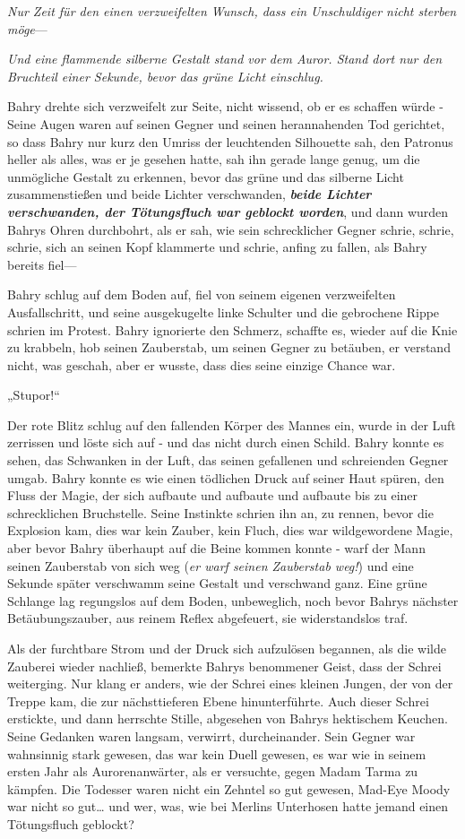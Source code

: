 {\emph{Nur Zeit für den einen verzweifelten Wunsch, dass ein Unschuldiger nicht sterben möge}—

\emph{Und eine flammende silberne Gestalt stand vor dem Auror. Stand dort nur den Bruchteil einer Sekunde, bevor das grüne Licht einschlug.}

Bahry drehte sich verzweifelt zur Seite, nicht wissend, ob er es schaffen würde - Seine Augen waren auf seinen Gegner und seinen herannahenden Tod gerichtet, so dass Bahry nur kurz den Umriss der leuchtenden Silhouette sah, den Patronus heller als alles, was er je gesehen hatte, sah ihn gerade lange genug, um die unmögliche Gestalt zu erkennen, bevor das grüne und das silberne Licht zusammenstießen und beide Lichter verschwanden, \textbf{\emph{beide Lichter verschwanden, der Tötungsfluch war geblockt worden}}, und dann wurden Bahrys Ohren durchbohrt, als er sah, wie sein schrecklicher Gegner schrie, schrie, schrie, sich an seinen Kopf klammerte und schrie, anfing zu fallen, als Bahry bereits fiel—

Bahry schlug auf dem Boden auf, fiel von seinem eigenen verzweifelten Ausfallschritt, und seine ausgekugelte linke Schulter und die gebrochene Rippe schrien im Protest. Bahry ignorierte den Schmerz, schaffte es, wieder auf die Knie zu krabbeln, hob seinen Zauberstab, um seinen Gegner zu betäuben, er verstand nicht, was geschah, aber er wusste, dass dies seine einzige Chance war.

„Stupor!“

Der rote Blitz schlug auf den fallenden Körper des Mannes ein, wurde in der Luft zerrissen und löste sich auf - und das nicht durch einen Schild. Bahry konnte es sehen, das Schwanken in der Luft, das seinen gefallenen und schreienden Gegner umgab. Bahry konnte es wie einen tödlichen Druck auf seiner Haut spüren, den Fluss der Magie, der sich aufbaute und aufbaute und aufbaute bis zu einer schrecklichen Bruchstelle. Seine Instinkte schrien ihn an, zu rennen, bevor die Explosion kam, dies war kein Zauber, kein Fluch, dies war wildgewordene Magie, aber bevor Bahry überhaupt auf die Beine kommen konnte - warf der Mann seinen Zauberstab von sich weg (\emph{er warf seinen Zauberstab weg!}) und eine Sekunde später verschwamm seine Gestalt und verschwand ganz. Eine grüne Schlange lag regungslos auf dem Boden, unbeweglich, noch bevor Bahrys nächster Betäubungszauber, aus reinem Reflex abgefeuert, sie widerstandslos traf.

Als der furchtbare Strom und der Druck sich aufzulösen begannen, als die wilde Zauberei wieder nachließ, bemerkte Bahrys benommener Geist, dass der Schrei weiterging. Nur klang er anders, wie der Schrei eines kleinen Jungen, der von der Treppe kam, die zur nächsttieferen Ebene hinunterführte. Auch dieser Schrei erstickte, und dann herrschte Stille, abgesehen von Bahrys hektischem Keuchen. Seine Gedanken waren langsam, verwirrt, durcheinander. Sein Gegner war wahnsinnig stark gewesen, das war kein Duell gewesen, es war wie in seinem ersten Jahr als Aurorenanwärter, als er versuchte, gegen Madam Tarma zu kämpfen. Die Todesser waren nicht ein Zehntel so gut gewesen, Mad-Eye Moody war nicht so gut… und wer, was, wie bei Merlins Unterhosen hatte jemand einen Tötungsfluch geblockt?

}
